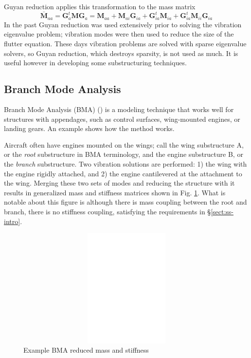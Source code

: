 \documentclass[11pt,openany,twoside]{book}
\numberwithin{equation}{section}		%
\newcommand{\Newterm}[1]{{\em #1}}
\newcommand{\Matrix}[1]{\boldsymbol{#1}}
\newcommand{\Sectref}[1]{\S\ref{#1}}
\newcommand{\Figref}[1]{Fig. \ref{#1}}  %
\begin{document}
Guyan reduction \cite{guyan1965reduction}
applies this transformation to the mass matrix
\begin{equation}\label{eqn:guyanM}
\Matrix{\bar{M}}_{aa} = \Matrix{G}_a^t\Matrix{M}\Matrix{G}_a =
	\Matrix{M}_{aa} + \Matrix{M}_{ai}\Matrix{G}_{ia}
		+ \Matrix{G}_{ia}^t \Matrix{M}_{ia}
			+ \Matrix{G}_{ia}^t\Matrix{M}_{ii}\Matrix{G}_{ia}
\end{equation}
In the past Guyan reduction was used extensively prior to solving
the vibration eigenvalue problem; vibration modes were then used to
reduce the size of the flutter equation.
These days vibration problems are solved with sparse eigenvalue solvers,
so Guyan reduction, which destroys sparsity, is not used as much.
It is useful however in developing some substructuring techniques.

\subsection{Branch Mode Analysis}\label{sect:bma}
Branch Mode Analysis (BMA) (\cite{gladwell1964branch}) is a modeling technique that
works well for structures with appendages, such as control surfaces,
wing-mounted engines, or landing gears.  An example shows how the method
works.

Aircraft often have engines mounted on the wings; call the wing
substructure A, or the \Newterm{root} substructure in BMA terminology,
and the engine substructure B, or the \Newterm{branch} substructure.
Two vibration solutions are performed: 1) the wing with the engine rigidly attached,
and 2) the engine cantilevered at the attachment to the wing. Merging these two
sets of modes and reducing the structure with it results in generalized mass and
stiffness matrices shown in \Figref{fig:bm-km}.  What is notable about this figure is
although there is mass coupling between the root and branch, there
is no stiffness coupling, satisfying the requirements in \Sectref{sect:ss-intro}.

\begin{figure}
\centering
	\includegraphics[height=6cm,width=12cm]{bmodes.eps}
\caption{Example BMA reduced mass and stiffness}\label{fig:bm-km}
\end{figure}
\end{document}
